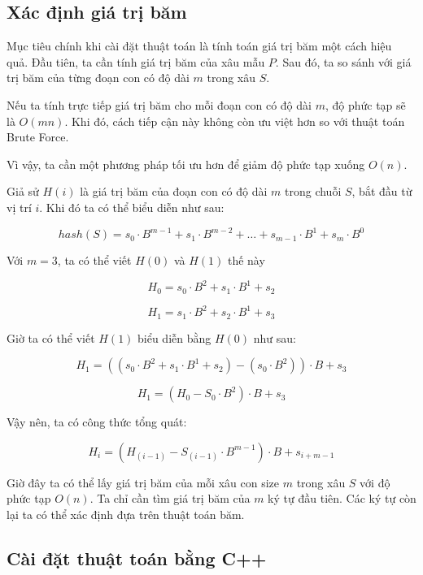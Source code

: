 \subsection{Xác định giá trị băm}

Mục tiêu chính khi cài đặt thuật toán là tính toán giá trị băm một cách hiệu quả. Đầu tiên, ta cần tính giá trị băm của xâu mẫu $P$. Sau đó, ta so sánh với giá trị băm của từng đoạn con có độ dài $m$ trong xâu $S$.

Nếu ta tính trực tiếp giá trị băm cho mỗi đoạn con có độ dài $m$, độ phức tạp sẽ là $O(mn)$. Khi đó, cách tiếp cận này không còn ưu việt hơn so với thuật toán Brute Force.

Vì vậy, ta cần một phương pháp tối ưu hơn để giảm độ phức tạp xuống $O(n)$.

Giả sử $H(i)$ là giá trị băm của đoạn con có độ dài $m$ trong chuỗi $S$, bắt đầu từ vị trí $i$. Khi đó ta có thể biểu diễn như sau:

\[
hash(S) = s_0 \cdot B^{m - 1} + s_1 \cdot B^{m-2} + \dots + s_{m - 1} \cdot B^{1} + s_m \cdot B^{0}
\]

Với $m = 3$, ta có thể viết $H(0)$ và $H(1)$ thế này

\[
H_0 = s_0 \cdot B^2 + s_1 \cdot B^1 + s_2 
\]

\[
H_1 = s_1 \cdot B^2 + s_2 \cdot B^1 + s_3
\]

Giờ ta có thể viết $H(1)$ biểu diễn bằng $H(0)$ như sau:

\[
H_1 = ((s_0 \cdot B^2 + s_1 \cdot B^1 + s_2) - (s_0 \cdot B^2)) \cdot B + s_3
\]

\[
H_1 = (H_0 - S_0 \cdot B^2) \cdot B + s_3
\]

Vậy nên, ta có công thức tổng quát:

\[
H_i = (H_(i - 1) - S_(i - 1) \cdot B^{m - 1}) \cdot B + s_{i + m - 1}
\]

Giờ đây ta có thể lấy giá trị băm của mỗi xâu con size $m$ trong xâu $S$ với độ phức tạp $O(n)$. Ta chỉ cần tìm giá trị băm của $m$ ký tự đầu tiên. Các ký tự còn lại ta có thể xác định đựa trên thuật toán băm.

\subsection{Cài đặt thuật toán bằng C++}

